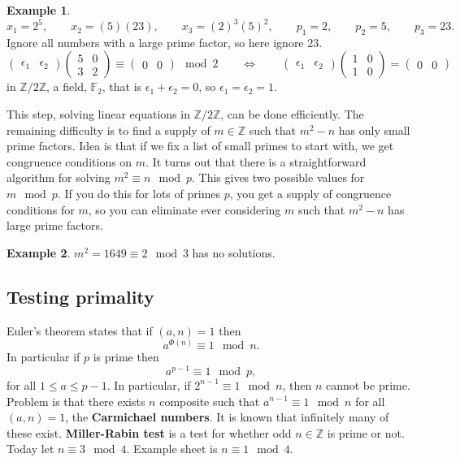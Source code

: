 \documentclass{article}
\newcommand{\F}{\mathbb{F}}
\newcommand{\Z}{\mathbb{Z}}
\newcommand{\rb}[1]{\left( #1 \right)}
\newcommand{\two}[2]{\begin{pmatrix} #1 \\ #2 \end{pmatrix}}
\theoremstyle{definition}\newtheorem{definition}{Definition}
\theoremstyle{definition}\newtheorem{remark}[definition]{Remark}
\theoremstyle{definition}\newtheorem*{example}{Example}
\theoremstyle{definition}\newtheorem*{note}{Note}
\begin{document}
\begin{example}
$$ x_1 = 2^5, \qquad x_2 = \rb{5}\rb{23}, \qquad x_3 = \rb{2}^3\rb{5}^2, \qquad p_1 = 2, \qquad p_2 = 5, \qquad p_3 = 23. $$
Ignore all numbers with a large prime factor, so here ignore $ 23 $.
$$ \begin{pmatrix} \epsilon_1 & \epsilon_2 \end{pmatrix} \two{5 & 0}{3 & 2} \equiv \begin{pmatrix} 0 & 0 \end{pmatrix} \mod 2 \qquad \iff \qquad \begin{pmatrix} \epsilon_1 & \epsilon_2 \end{pmatrix} \two{1 & 0}{1 & 0} = \begin{pmatrix} 0 & 0 \end{pmatrix} $$
in $ \Z / 2\Z $, a field, $ \F_2 $, that is $ \epsilon_1 + \epsilon_2 = 0 $, so $ \epsilon_1 = \epsilon_2 = 1 $.
\end{example}

This step, solving linear equations in $ \Z / 2\Z $, can be done efficiently. The remaining difficulty is to find a supply of $ m \in \Z $ such that $ m^2 - n $ has only small prime factors. Idea is that if we fix a list of small primes to start with, we get congruence conditions on $ m $. It turns out that there is a straightforward algorithm for solving $ m^2 \equiv n \mod p $. This gives two possible values for $ m \mod p $. If you do this for lots of primes $ p $, you get a supply of congruence conditions for $ m $, so you can eliminate ever considering $ m $ such that $ m^2 - n $ has large prime factors.

\begin{example}
$ m^2 = 1649 \equiv 2 \mod 3 $ has no solutions.
\end{example}


\subsection{Testing primality}

Euler's theorem states that if $ \rb{a, n} = 1 $ then
$$ a^{\Phi\rb{n}} \equiv 1 \mod n. $$
In particular if $ p $ is prime then
$$ a^{p - 1} \equiv 1 \mod p, $$
for all $ 1 \le a \le p - 1 $. In particular, if $ 2^{n - 1} \equiv 1 \mod n $, then $ n $ cannot be prime. Problem is that there exists $ n $ composite such that $ a^{n - 1} \equiv 1 \mod n $ for all $ \rb{a, n} = 1 $, the \textbf{Carmichael numbers}. It is known that infinitely many of these exist. \textbf{Miller-Rabin test} is a test for whether odd $ n \in \Z $ is prime or not. Today let $ n \equiv 3 \mod 4 $. Example sheet is $ n \equiv 1 \mod 4 $.
\end{document}
